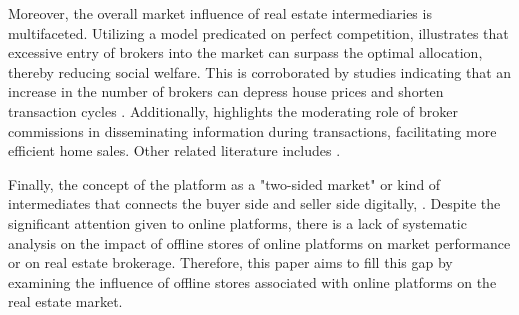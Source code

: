 \documentclass[12pt]{article}
\begin{document}
Moreover, the overall market influence of real estate intermediaries is multifaceted. Utilizing a model predicated on perfect competition, \citet{williams_agency_1998} illustrates that excessive entry of brokers into the market can surpass the optimal allocation, thereby reducing social welfare. This is corroborated by studies indicating that an increase in the number of brokers can depress house prices and shorten transaction cycles \citep{https://doi.org/10.1002/jae.2891}. Additionally, \citet{qu_identifying_2021-1} highlights the moderating role of broker commissions in disseminating information during transactions, facilitating more efficient home sales. Other related literature includes \citep{doi:10.1080/10527001.2021.2016340, doi:10.1080/10835547.1996.12090852}.

Finally, the concept of the platform as a "two-sided market" or kind of intermediates that connects the buyer side and seller side digitally, \citep{10.1162/154247603322493212, Langley_Leyshon_2017}. Despite the significant attention given to online platforms, there is a lack of systematic analysis on the impact of offline stores of online platforms on market performance or on real estate brokerage. Therefore, this paper aims to fill this gap by examining the influence of offline stores associated with online platforms on the real estate market.


\end{document}
